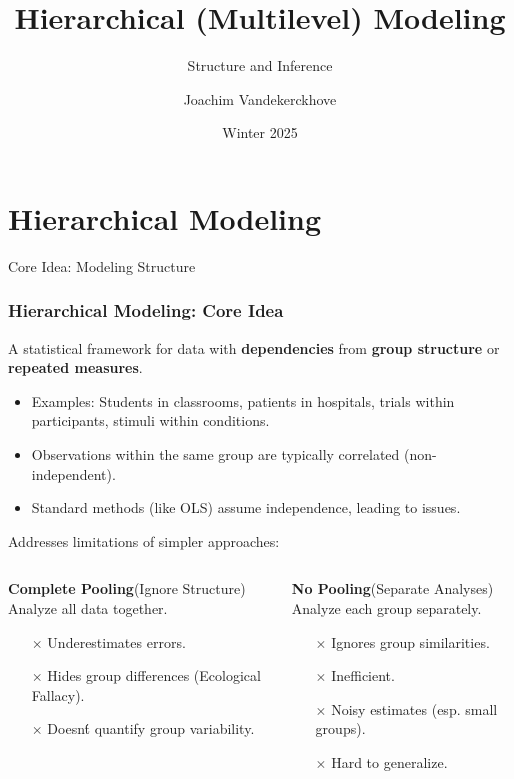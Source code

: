 \documentclass[aspectratio=169]{beamer}
\title{Hierarchical (Multilevel) Modeling}
\subtitle{Structure and Inference}
\author{Joachim Vandekerckhove}
\date{Winter 2025}
\begin{document}
\maketitle

\section{Hierarchical Modeling}

\begin{frame}{Core Idea: Modeling Structure}
    \frametitle{Hierarchical Modeling: Core Idea}
    A statistical framework for data with \textbf{dependencies} from \textbf{group structure} or \textbf{repeated measures}.
    \pause
    \begin{itemize}
        \item Examples: Students in classrooms, patients in hospitals, trials within participants, stimuli within conditions.
        \item Observations within the same group are typically correlated (non-independent).
        \item Standard methods (like OLS) assume independence, leading to issues.
    \end{itemize}
    \pause
    \vfill
    Addresses limitations of simpler approaches:
    \begin{columns}[T] %
        \begin{column}{0.5\textwidth}
            \textbf{Complete Pooling}\quad (Ignore Structure)\\
            \small Analyze all data together.
            \begin{itemize}
                \item[$\times$] Underestimates errors.
                \item[$\times$] Hides group differences (Ecological Fallacy).
                \item[$\times$] Doesn\'t quantify group variability.
            \end{itemize}
        \end{column}
        \begin{column}{0.5\textwidth}
            \textbf{No Pooling}\quad (Separate Analyses)\\
            \small Analyze each group separately.
            \begin{itemize}
                \item[$\times$] Ignores group similarities.
                \item[$\times$] Inefficient.
                \item[$\times$] Noisy estimates (esp. small groups).
                \item[$\times$] Hard to generalize.
            \end{itemize}
        \end{column}
    \end{columns}
\end{frame}
\end{document}
